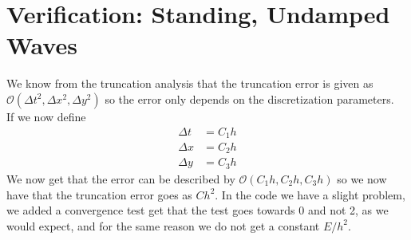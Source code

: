 \documentclass[12pt, norsk, a4paper]{article}
\begin{document}
\section*{Verification: Standing, Undamped Waves}
We know from the truncation analysis that the truncation error is given as $\mathcal{O}(\Delta t^2, \Delta x^2, \Delta y^2)$ so the error only depends on the discretization parameters. \\
If we now define
\begin{align*}
\Delta t &= C_1 h \\
\Delta x &= C_2 h \\
\Delta y &= C_3 h
\end{align*}
We now get that the error can be described by $\mathcal{O}(C_1h, C_2h, C_3h)$ so we now have that the truncation error goes as $Ch^2$. In the code we have a slight problem, we added a convergence test get that the test goes towards 0 and not 2, as we would expect, and for the same reason we do not get a constant $E/h^2$.
\end{document}
